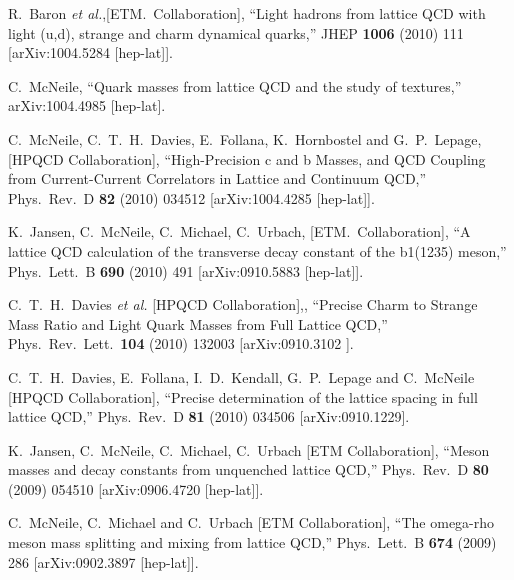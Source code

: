\begin{thebibliography}{130}
  R.~Baron {\it et al.},[ETM.~Collaboration],
  ``Light hadrons from lattice QCD with light (u,d), strange and
  charm
  dynamical quarks,''
  JHEP {\bf 1006} (2010) 111
  [arXiv:1004.5284 [hep-lat]].



  C.~McNeile,
  ``Quark masses from lattice QCD and the study of textures,''
  arXiv:1004.4985 [hep-lat].

  C.~McNeile, C.~T.~H.~Davies, E.~Follana, K.~Hornbostel and
  G.~P.~Lepage, [HPQCD Collaboration],
  ``High-Precision c and b Masses, and QCD Coupling from
  Current-Current
  Correlators in Lattice and Continuum QCD,''
  Phys.\ Rev.\  D {\bf 82} (2010) 034512
  [arXiv:1004.4285 [hep-lat]].

  K.~Jansen, C.~McNeile, C.~Michael, C.~Urbach,
  [ETM.~Collaboration],
  ``A lattice QCD calculation of the transverse decay constant of the
  b1(1235)
  meson,''
  Phys.\ Lett.\  B {\bf 690} (2010) 491
  [arXiv:0910.5883 [hep-lat]].


  C.~T.~H.~Davies {\it et al.} [HPQCD Collaboration],,
``Precise Charm to Strange Mass Ratio and Light Quark Masses from
Full
Lattice QCD,''
  Phys.\ Rev.\ Lett.\  {\bf 104} (2010) 132003
  [arXiv:0910.3102 ].



  C.~T.~H.~Davies, E.~Follana, I.~D.~Kendall, G.~P.~Lepage and
  C.~McNeile
                  [HPQCD Collaboration],
  ``Precise determination of the lattice spacing in full lattice
  QCD,''
  Phys.\ Rev.\  D {\bf 81} (2010) 034506
  [arXiv:0910.1229].



  K.~Jansen, C.~McNeile, C.~Michael, C.~Urbach
 [ETM Collaboration],
  ``Meson masses and decay constants from unquenched lattice QCD,''
  Phys.\ Rev.\  D {\bf 80} (2009) 054510
  [arXiv:0906.4720 [hep-lat]].


  C.~McNeile, C.~Michael and C.~Urbach  [ETM Collaboration],
  ``The omega-rho meson mass splitting and mixing from lattice QCD,''
  Phys.\ Lett.\  B {\bf 674} (2009) 286
  [arXiv:0902.3897 [hep-lat]].


\end{thebibliography}
